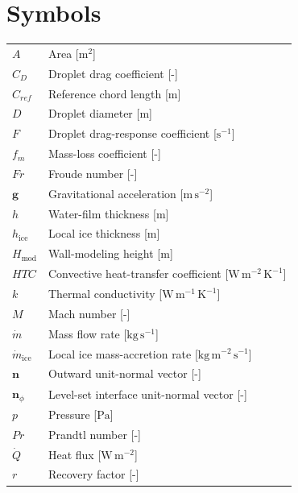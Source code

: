 \section*{Symbols}
\begin{longtable}{lp{5in}}
$A$                          & Area [$\mathrm{m^2}$]\\
$C_D$                        & Droplet drag coefficient [-]\\
$C_{ref}$                    & Reference chord length [$\mathrm{m}$]\\
$D$                          & Droplet diameter [$\mathrm{m}$]\\
$F$                          & Droplet drag-response coefficient [$\mathrm{s^{-1}}$]\\
$f_m$                        & Mass-loss coefficient [-]\\
$Fr$                         & Froude number [-]\\
$\boldsymbol{g}$             & Gravitational acceleration [$\mathrm{m\,s^{-2}}$]\\
$h$                          & Water-film thickness [$\mathrm{m}$]\\
$h_{\mathrm{ice}}$           & Local ice thickness [$\mathrm{m}$]\\
$H_{\mathrm{mod}}$           & Wall-modeling height [$\mathrm{m}$]\\
$HTC$                        & Convective heat-transfer coefficient [$\mathrm{W\,m^{-2}\,K^{-1}}$]\\
$k$                          & Thermal conductivity [$\mathrm{W\,m^{-1}\,K^{-1}}$]\\
$M$                          & Mach number [-]\\
$\dot{m}$                    & Mass flow rate [$\mathrm{kg\,s^{-1}}$]\\
$\dot{m}_{\mathrm{ice}}$     & Local ice mass-accretion rate [$\mathrm{kg\,m^{-2}\,s^{-1}}$]\\
$\boldsymbol{n}$             & Outward unit-normal vector [-]\\
$\boldsymbol{n}_{\phi}$      & Level-set interface unit-normal vector [-]\\
$p$                          & Pressure [$\mathrm{Pa}$]\\
$Pr$                         & Prandtl number [-]\\
$\dot{Q}$                    & Heat flux [$\mathrm{W\,m^{-2}}$]\\
$r$                          & Recovery factor [-]\\

\end{longtable}
